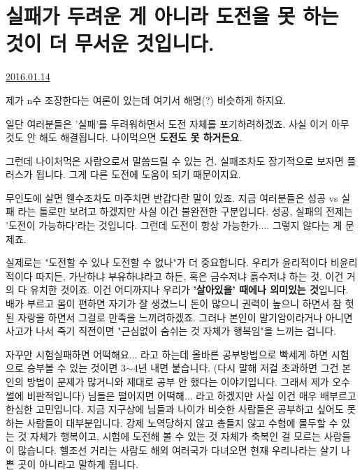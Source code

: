 \section{실패가 두려운 게 아니라 도전을 못 하는 것이 더 무서운 것입니다.}
\href{https://www.kockoc.com/Apoc/587914}{2016.01.14}

\vspace{5mm}

제가 n수 조장한다는 여론이 있는데 여기서 해명(?) 비슷하게  하지요.
\vspace{5mm}

일단 여러분들은 '실패'를 두려워하면서 도전 자체를 포기하려하겠죠.
사실 이거 아무 것도 안 해도 해결됩니다.
나이먹으면 \textbf{도전도 못 하거든요}.
\vspace{5mm}

그런데 나이처먹은 사람으로서 말씀드릴 수 있는 건.
실패조차도 장기적으로 보자면 플러스가 됩니다. 그게 다른 도전에 도움이 되기 때문이지요.
\vspace{5mm}

무인도에 살면 웬수조차도 마주치면 반갑다란 말이 있죠.
지금 여러분들은 성공 vs 실패 라는 틀로만 보려고 하겠지만 사실 이건 불완전한 구분입니다.
성공, 실패의 전제는 '도전이 가능하다'라는 것입니다.
그런데 도전이 항상 가능한가.... 그렇지 않다는 게 문제죠.
\vspace{5mm}

실제로는 "도전할 수 있나 도전할 수 없나"가 더 중요합니다.
우리가 윤리적이다 비윤리적이다 따지든, 가난하냐 부유하냐라고 하든, 혹은 금수저냐 흙수저냐 하는 것. 이건 거의 다 유치한 것이죠.
이건 어디까지나 우리가 \textbf{'살아있을' 때에나 의미있는 것}입니다.
배가 부르고 몸이 편하면 자기가 잘 생겼느니 돈이 많으니 권력이 높으니 하면서 참 헛된 자랑을 하면서 그걸로 만족을 느끼려하겠죠.
그러나 본인이 말기암이라거나 아니면 사고가 나서 죽기 직전이면 "근심없이 숨쉬는 것 자체가 행복임"을 느끼는 겁니다.
\vspace{5mm}

자꾸만 시험실패하면 어떡해요... 라고 하는데 올바른 공부방법으로 빡세게 하면 시험으로 승부볼 수 있는 것이면 3$\sim$4년 내면 붙습니다.
(다시 말해 저걸 초과하면 그건 본인의 방법이 문제가 많거니와 제대로 공부 안 했다는 이야기입니다. 그래서 제가 오수썰에 비판적입니다)
님들은 떨어지면 어떡해... 라고 하겠지만 사실 이건 매우 배부르고 한심한 고민입니다.
지금 지구상에 님들과 나이가 비슷한 사람들은 공부하고 싶어도 못 하는 사람들이 대부분입니다.
강제 노역당하지 않고 총들지 않고 수험에 몰두할 수 있는 것 자체가 행복이고,
시험에 도전해 볼 수 있는 것 자체가 축복인 걸 모르는 사람들이 많습니다.
헬조선 거리는 사람도 해외 여러국가 다녀오면 현재 우리나라는 살기 나쁜 곳이 아니라고 말하게 됩니다.
\vspace{5mm}

